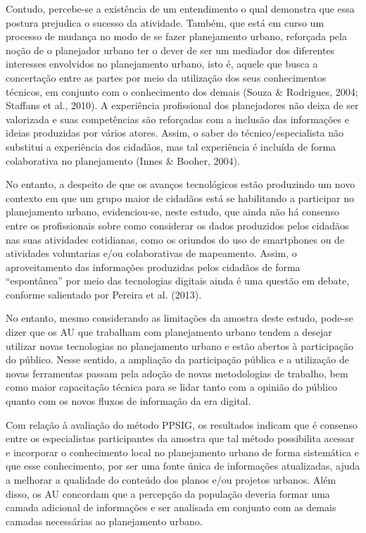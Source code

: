 \documentclass{article}
\begin{document}
Contudo, percebe-se a existência de um entendimento o qual demonstra que essa
postura
prejudica o sucesso da atividade. Também, que está em curso um processo de
mudança
no modo de se fazer planejamento urbano, reforçada pela noção de o planejador
urbano
ter o dever de ser um mediador dos diferentes interesses envolvidos no
planejamento
urbano, isto é, aquele que busca a concertação entre as partes por meio da
utilização dos seus conhecimentos técnicos, em conjunto com o conhecimento dos
demais (Souza \& Rodrigues, 2004; Staffans et al., 2010). A experiência
profissional dos planejadores não deixa de ser valorizada e suas competências
são
reforçadas com a inclusão das informações e ideias produzidas por vários atores.
Assim, o saber do técnico/especialista não substitui a experiência dos cidadãos,
mas
tal experiência é incluída de forma colaborativa no planejamento (Innes \&
Booher, 2004).

No entanto, a despeito de que os avanços tecnológicos estão produzindo um novo
contexto em que um grupo maior de cidadãos está se habilitando a participar no
planejamento urbano, evidenciou-se, neste estudo, que ainda não há consenso
entre os
profissionais sobre como considerar os dados produzidos pelos cidadãos nas suas
atividades cotidianas, como os oriundos do uso de smartphones ou de
atividades voluntarias e/ou colaborativas de mapeamento. Assim, o aproveitamento
das
informações produzidas pelos cidadãos de forma “espontânea” por meio das
tecnologias
digitais ainda é uma questão em debate, conforme salientado por Pereira et al.
(2013).

No entanto, mesmo considerando as limitações da amostra deste estudo, pode-se
dizer
que os AU que trabalham com planejamento urbano tendem a desejar utilizar novas
tecnologias no planejamento urbano e estão abertos à participação do público.
Nesse
sentido, a ampliação da participação pública e a utilização de novas ferramentas
passam pela adoção de novas metodologias de trabalho, bem como maior capacitação
técnica para se lidar tanto com a opinião do público quanto com os novos fluxos
de
informação da era digital.

Com relação à avaliação do método PPSIG, os resultados indicam que é consenso
entre
os especialistas participantes da amostra que tal método possibilita acessar e
incorporar o conhecimento local no planejamento urbano de forma sistemática e
que
esse conhecimento, por ser uma fonte única de informações atualizadas, ajuda a
melhorar a qualidade do conteúdo dos planos e/ou projetos urbanos. Além disso,
os AU
concordam que a percepção da população deveria formar uma camada adicional de
informações e ser analisada em conjunto com as demais camadas necessárias ao
planejamento urbano.
\end{document}
